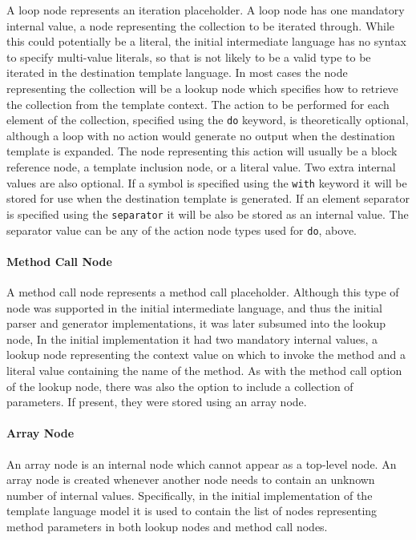 A loop node represents an iteration placeholder. A loop node has one mandatory internal value, a node representing the collection to be iterated through. While this could potentially be a literal, the initial intermediate language has no syntax to specify multi-value literals, so that is not likely to be a valid type to be iterated in the destination template language. In most cases the node representing the collection will be a lookup node which specifies how to retrieve the collection from the template context. The action to be performed for each element of the collection, specified using the \verb!do! keyword, is theoretically optional, although a loop with no action would generate no output when the destination template is expanded. The node representing this action will usually be a block reference node, a template inclusion node, or a literal value. Two extra internal values are also optional. If a symbol is specified using the \verb!with! keyword it will be stored for use when the destination template is generated. If an element separator is specified using the \verb!separator! it will be also be stored as an internal value. The separator value can be any of the action node types used for \verb!do!, above.

\paragraph{Method Call Node}

A method call node represents a method call placeholder. Although this type of node was supported in the initial intermediate language, and thus the initial parser and generator implementations, it was later subsumed into the lookup node, In the initial implementation it had two mandatory internal values, a lookup node representing the context value on which to invoke the method and a literal value containing the name of the method. As with the method call option of the lookup node, there was also the option to include a collection of parameters. If present, they were stored using an array node.

\paragraph{Array Node}

An array node is an internal node which cannot appear as a top-level node. An array node is created whenever another node needs to contain an unknown number of internal values. Specifically, in the initial implementation of the template language model it is used to contain the list of nodes representing method parameters in both lookup nodes and method call nodes.

